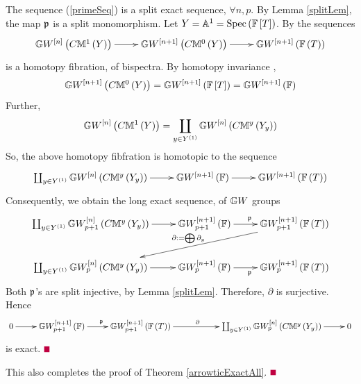 \documentclass[12pt]{article}
\begin{document}
\bL\label{MorExact}{\rm 
The sequence (\ref{primeSeq}) 
 is a split exact sequence,  $\forall n, p$.
}
\eL
\pf By Lemma \ref{splitLem}, the map $\mathfrak {p}$ is a split monomorphism. 
Let $Y={\mathbb{A}}^1=\mathrm{Spec}\left({\mathbb{F}}\left[ T\right]\right)$. 
By \cite[pp 473]{M23} the sequences 
$$
\diagram 
{\BG}W^{\LRt{n}}\LRf{C{\BM}^1\LRf{Y}} \ar[r] & {\BG}W^{\LRt{n+1}}\LRf{C{\BM}^0\LRf{Y}} \ar[r]&
{\BG}W^{\LRt{n+1}}\LRf{{\BF}\LRf{T}}\\
\enddiagram 
$$
is a homotopy fibration, of bispectra. By homotopy invariance \cite[Thm 9.8]{S17}, 
$$
 {\mathbb{G}}W^{\left[ n+1\right]}\left( C{\mathbb{M}}^0\left( Y\right)\right)=  {\mathbb{G}}W^{\left[ n+1\right]}\left( {\mathbb{F}}\left[ T\right]\right)
=  {\mathbb{G}}W^{\left[ n+1\right]}\left( {\mathbb{F}}\right)
$$
Further, 
$$
{\mathbb{G}}W^{\left[ n\right]}\left( C{\mathbb{M}}^1\left( Y\right)\right)  =\coprod_{y\in Y^{\left( 1\right)}} {\mathbb{G}}W^{\left[ n\right]}\left( C{\mathbb{M}}^y\left( Y_y\right)\right) 
$$
So, the above homotopy fibfration is homotopic to the sequence
$$
\diagram 
\coprod_{y\in Y^{\LRf{1}}} {\BG}W^{\LRt{n}}\LRf{C{\BM}^y\LRf{Y_y}}  \ar[r] & 
{\BG}W^{\LRt{n+1}}\LRf{{\BF}} \ar[r]&
{\BG}W^{\LRt{n+1}}\LRf{{\BF}\LRf{T}}\\
\enddiagram 
$$
Consequently, we obtain the long exact sequence, of ${\mathbb{G}}W$ groups
$$
\diagram 
\coprod_{y\in Y^{\LRf{1}}} {\BG}W_{p+1}^{\LRt{n}}\LRf{C{\BM}^y\LRf{Y_y}}  \ar[r] & 
{\BG}W_{p+1}^{\LRt{n+1}}\LRf{{\BF}} \ar[r]^{\p}&
{\BG}W_{p+1}^{\LRt{n+1}}\LRf{{\BF}\LRf{T}}\ar[dll]_{\partial:=\bigoplus \partial_y}\\
\coprod_{y\in Y^{\LRf{1}}} {\BG}W_{p}^{\LRt{n}}\LRf{C{\BM}^y\LRf{Y_y}}  \ar[r] & 
{\BG}W_{p}^{\LRt{n+1}}\LRf{{\BF}} \ar[r]_{\p}&
{\BG}W_{p}^{\LRt{n+1}}\LRf{{\BF}\LRf{T}}\\
\enddiagram 
$$
Both $\mathfrak {p}$'s are split injective, by Lemma \ref{splitLem}. Therefore, $\partial$ is surjective.  Hence
$$
\diagram 
0  \ar[r] & 
{\BG}W_{p+1}^{\LRt{n+1}}\LRf{{\BF}} \ar[r]^{\p}&
{\BG}W_{p+1}^{\LRt{n+1}}\LRf{{\BF}\LRf{T}}\ar[rr]^{\partial\qquad} &&
\coprod_{y\in Y^{\LRf{1}}} {\BG}W_{p}^{\LRt{n}}\LRf{C{\BM}^y\LRf{Y_y}}  \ar[r] & 
0\\
\enddiagram 
$$
is exact. $\eop$ 

\vspace{3mm}
This also completes the proof of Theorem \ref{arrowticExactAll}. $\eop$
\end{document}
